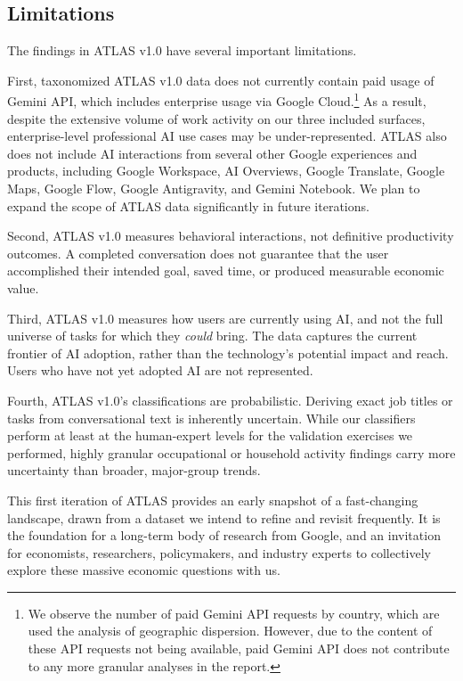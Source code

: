 \documentclass[11pt,a4paper]{article}
\begin{document}
\subsection{Limitations}\label{subsec:limitations}

The findings in ATLAS v1.0 have several important limitations.

First, taxonomized ATLAS v1.0 data does not currently contain paid usage of Gemini API, which includes enterprise usage via Google Cloud.\footnote{We observe the number of paid Gemini API requests by country, which are used the analysis of geographic dispersion. However, due to the content of these API requests not being available,  paid Gemini API does not contribute to any more granular analyses in the report.} As a result, despite the extensive volume of work activity on our three included surfaces, enterprise-level professional AI use cases may be under-represented. ATLAS also does not include AI interactions from several other Google experiences and products, including Google Workspace, AI Overviews, Google Translate, Google Maps, Google Flow, Google Antigravity, and Gemini Notebook. We plan to expand the scope of ATLAS data significantly in future iterations. 
    
Second, ATLAS v1.0 measures behavioral interactions, not definitive productivity outcomes. A completed conversation does not guarantee that the user accomplished their intended goal, saved time, or produced measurable economic value.
    
Third, ATLAS v1.0 measures how users are currently using AI, and not the full universe of tasks for which they \emph{could} bring. The data captures the current frontier of AI adoption, rather than the technology’s potential impact and reach. Users who have not yet adopted AI are not represented.
    
Fourth, ATLAS v1.0’s classifications are probabilistic. Deriving exact job titles or tasks from conversational text is inherently uncertain. While our classifiers perform at least at the human-expert levels for the validation exercises we performed, highly granular occupational or household activity findings carry more uncertainty than broader, major-group trends. 

This first iteration of ATLAS provides an early snapshot of a fast-changing landscape, drawn from a dataset we intend to refine and revisit frequently. It is the foundation for a long-term body of research from Google, and an invitation for economists, researchers, policymakers, and industry experts to collectively explore these massive economic questions with us. 
\end{document}
